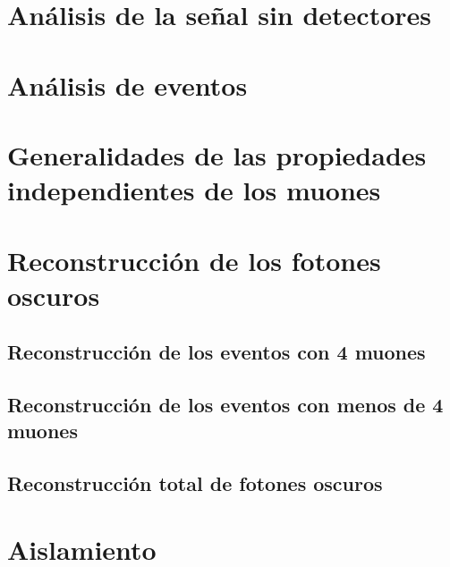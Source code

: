\documentclass[12pt]{report}
\begin{document}
	\section{Análisis de la señal sin detectores}
	
	
	\section{Análisis de eventos}
    
    
    \section{Generalidades de las propiedades independientes de los muones}
    
    
	\section{Reconstrucción de los fotones oscuros}
	
		\subsection{Reconstrucción de los eventos con 4 muones}
		
		
		\subsection{Reconstrucción de los eventos con menos de 4 muones}	
		
		
		\subsection{Reconstrucción total de fotones oscuros}	
		

    
    \section{Aislamiento}
    

    
\end{document}
